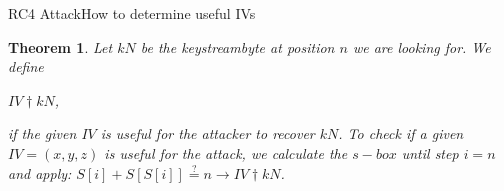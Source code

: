 \documentclass[
	aspectratio=169,	%
	onlytextwidth,		%
	t,					%
	]{beamer}
\newtheorem{thm}{Theorem}
\begin{document}
\begin{frame}[fragile]{RC4 Attack}{How to determine useful IVs}
	\begin{thm}
		Let $kN$ be the keystreambyte at position $n$ we are looking for. We define\\
		\begin{center}$IV \dagger kN$,
		\end{center}
		if the given $IV$ is useful for the attacker to recover $kN$.
		To check if a given $IV=(x,y,z)$ is useful for the attack, 
        we calculate the $s-box$ until step $i=n$ and apply:
		$S[i] + S[S[i]] \stackrel{?}{=} n \rightarrow IV \dagger kN$.
	\end{thm} 
\end{frame}

\appendix

\makethankyou

\begin{frame}
    \printbibliography
\end{frame}
\end{document}
